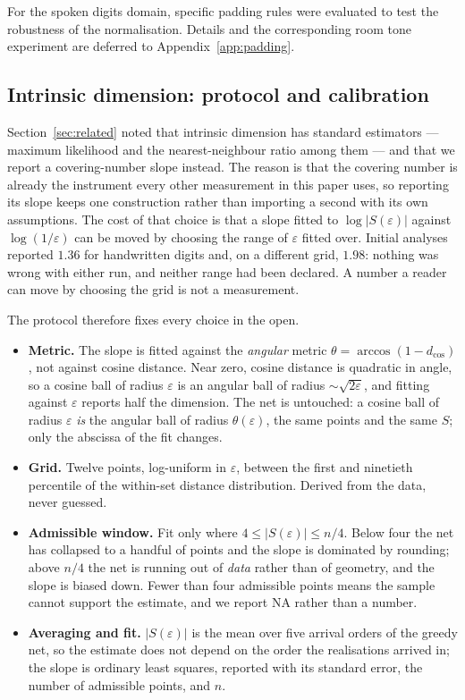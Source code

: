\documentclass[10pt]{article}
\theoremstyle{plain}
\theoremstyle{definition}
\theoremstyle{remark}
\begin{document}
For the spoken digits domain, specific padding rules were evaluated to test the robustness of the normalisation. Details and the corresponding room tone experiment are deferred to Appendix~\ref{app:padding}.
\subsection{Intrinsic dimension: protocol and calibration}
\label{sec:dimension-protocol}

Section~\ref{sec:related} noted that intrinsic dimension has standard
estimators --- maximum likelihood \citep{levina2004maximum} and the
nearest-neighbour ratio \citep{facco2017twonn} among them --- and that we report
a covering-number slope instead. The reason is that the covering number is
already the instrument every other measurement in this paper uses, so reporting
its slope keeps one construction rather than importing a second with its own
assumptions. The cost of that choice is that a slope fitted to
$\log |S(\varepsilon)|$ against $\log(1/\varepsilon)$ can be moved by choosing
the range of $\varepsilon$ fitted over. Initial analyses reported
$1.36$ for handwritten digits and, on a different grid, $1.98$: nothing was
wrong with either run, and neither range had been declared. A number a reader
can move by choosing the grid is not a measurement.

The protocol therefore fixes every choice in the open.

\begin{itemize}
  \item \textbf{Metric.} The slope is fitted against the \emph{angular} metric
    $\theta = \arccos(1 - d_{\cos})$, not against cosine distance. Near zero,
    cosine distance is quadratic in angle, so a cosine ball of radius
    $\varepsilon$ is an angular ball of radius ${\sim}\sqrt{2\varepsilon}$, and
    fitting against $\varepsilon$ reports half the dimension. The net is
    untouched: a cosine ball of radius $\varepsilon$ \emph{is} the angular ball
    of radius $\theta(\varepsilon)$, the same points and the same $S$; only the
    abscissa of the fit changes.
  \item \textbf{Grid.} Twelve points, log-uniform in $\varepsilon$, between the
    first and ninetieth percentile of the within-set distance distribution.
    Derived from the data, never guessed.
  \item \textbf{Admissible window.} Fit only where
    $4 \le |S(\varepsilon)| \le n/4$. Below four the net has collapsed to a
    handful of points and the slope is dominated by rounding; above $n/4$ the
    net is running out of \emph{data} rather than of geometry, and the slope is
    biased down. Fewer than four admissible points means the sample cannot
    support the estimate, and we report NA rather than a number.
  \item \textbf{Averaging and fit.} $|S(\varepsilon)|$ is the mean over five
    arrival orders of the greedy net, so the estimate does not depend on the
    order the realisations arrived in; the slope is ordinary least squares,
    reported with its standard error, the number of admissible points, and $n$.
\end{itemize}
\end{document}
